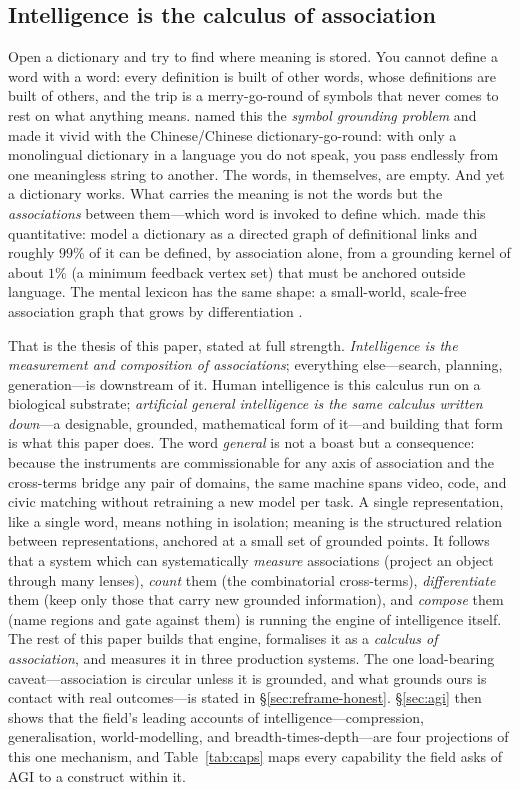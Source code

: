 \documentclass[10pt,twocolumn]{article}
\begin{document}
\subsection{Intelligence is the calculus of association}
\label{sec:thesis}
Open a dictionary and try to find where meaning is stored. You cannot define a
word with a word: every definition is built of other words, whose definitions are
built of others, and the trip is a merry-go-round of symbols that never comes to
rest on what anything means. \citet{harnad1990symbol} named this the
\emph{symbol grounding problem} and made it vivid with the Chinese/Chinese
dictionary-go-round: with only a monolingual dictionary in a language you do not
speak, you pass endlessly from one meaningless string to another. The words, in
themselves, are empty. And yet a dictionary works. What carries the meaning is not
the words but the \emph{associations} between them---which word is invoked to
define which. \citet{vincentlamarre2016latent} made this quantitative: model a
dictionary as a directed graph of definitional links and roughly $99\%$ of it can
be defined, by association alone, from a grounding kernel of about $1\%$ (a
minimum feedback vertex set) that must be anchored outside language. The mental
lexicon has the same shape: a small-world, scale-free association graph that grows
by differentiation \citep{steyvers2005largescale}.

That is the thesis of this paper, stated at full strength. \emph{Intelligence is
the measurement and composition of associations}; everything else---search,
planning, generation---is downstream of it. Human intelligence is this calculus
run on a biological substrate; \emph{artificial general intelligence is the same
calculus written down}---a designable, grounded, mathematical form of it---and
building that form is what this paper does. The word \emph{general} is not a boast
but a consequence: because the instruments are commissionable for any axis of
association and the cross-terms bridge any pair of domains, the same machine spans
video, code, and civic matching without retraining a new model per task. A single
representation, like a single word, means nothing in isolation; meaning is the structured relation between
representations, anchored at a small set of grounded points. It follows that a
system which can systematically \emph{measure} associations (project an object
through many lenses), \emph{count} them (the combinatorial cross-terms),
\emph{differentiate} them (keep only those that carry new grounded information),
and \emph{compose} them (name regions and gate against them) is running the engine
of intelligence itself. The rest of this paper builds that engine, formalises it
as a \emph{calculus of association}, and measures it in three production systems.
The one load-bearing caveat---association is circular unless it is grounded, and
what grounds ours is contact with real outcomes---is stated in
\S\ref{sec:reframe-honest}. \S\ref{sec:agi} then shows that the field's leading
accounts of intelligence---compression, generalisation, world-modelling, and
breadth-times-depth---are four projections of this one mechanism, and
Table~\ref{tab:caps} maps every capability the field asks of AGI to a construct
within it.
\end{document}
